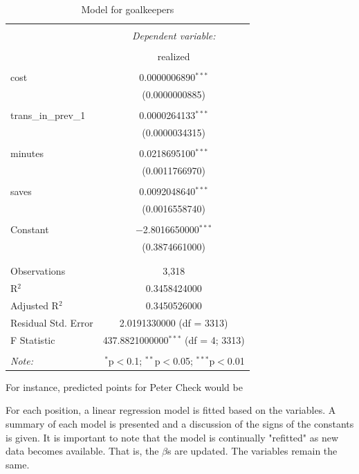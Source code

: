 \begin{table}[!htbp] \centering 
  \caption{Model for goalkeepers} 
  \label{tab:reg_gk} 
\begin{tabular}{@{\extracolsep{5pt}}lc} 
\\[-1.8ex]\hline 
\hline \\[-1.8ex] 
 & \multicolumn{1}{c}{\textit{Dependent variable:}} \\ 
\cline{2-2} 
\\[-1.8ex] & realized \\ 
\hline \\[-1.8ex] 
 cost & 0.0000006890$^{***}$ \\ 
  & (0.0000000885) \\ 
  & \\ 
 trans\_in\_prev\_1 & 0.0000264133$^{***}$ \\ 
  & (0.0000034315) \\ 
  & \\ 
 minutes & 0.0218695100$^{***}$ \\ 
  & (0.0011766970) \\ 
  & \\ 
 saves & 0.0092048640$^{***}$ \\ 
  & (0.0016558740) \\ 
  & \\ 
 Constant & $-$2.8016650000$^{***}$ \\ 
  & (0.3874661000) \\ 
  & \\ 
\hline \\[-1.8ex] 
Observations & 3,318 \\ 
R$^{2}$ & 0.3458424000 \\ 
Adjusted R$^{2}$ & 0.3450526000 \\ 
Residual Std. Error & 2.0191330000 (df = 3313) \\ 
F Statistic & 437.8821000000$^{***}$ (df = 4; 3313) \\ 
\hline 
\hline \\[-1.8ex] 
\textit{Note:}  & \multicolumn{1}{r}{$^{*}$p$<$0.1; $^{**}$p$<$0.05; $^{***}$p$<$0.01} \\ 
\end{tabular} 
\end{table} 

For instance, predicted points for Peter Check would be \newpar

For each position, a linear regression model is fitted based on the variables. A summary of each model is presented and a discussion of the signs of the constants is given. It is important to note that the model is continually "refitted" as new data becomes available. That is, the $\beta $s are updated. The variables remain the same. \newpar

